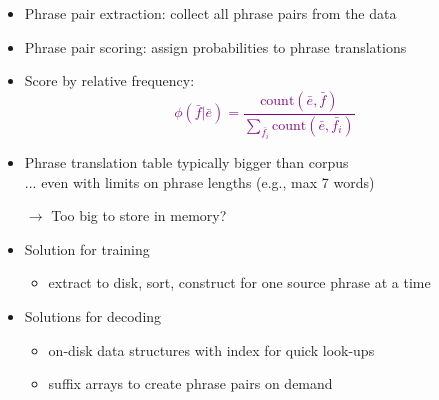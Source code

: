 \documentclass[landscape]{slides}
\newcommand{\maths}[1]{\textcolor{purple}{#1}}
\begin{document}

\begin{itemize} \vspace{20mm}
\item Phrase pair extraction: collect all phrase pairs from the data
\item Phrase pair scoring: assign probabilities to phrase translations
\item Score by relative frequency:
\maths{\begin{equation*}
\phi(\bar{f}|\bar{e}) = \frac{\mbox{count}(\bar{e},\bar{f})}{\sum_{\bar{f_i}}\mbox{count}(\bar{e},\bar{f_i})}
\end{equation*}}
\end{itemize}


\begin{itemize}
\item Phrase translation table typically bigger than corpus\\[3mm]
... even with limits on phrase lengths (e.g., max 7 words)
\item[$\rightarrow$] Too big to store in memory?
\item Solution for training
\begin{itemize}
\item extract to disk, sort, construct for one source phrase at a time
\end{itemize}
\item Solutions for decoding
\begin{itemize}
\item on-disk data structures with index for quick look-ups
\item suffix arrays to create phrase pairs on demand
\end{itemize}
\end{itemize}


\end{document}
